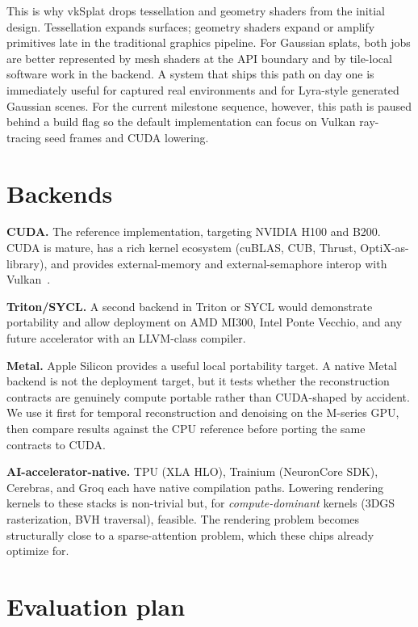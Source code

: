 \documentclass[10pt,journal]{IEEEtran}
\begin{document}
This is why vkSplat drops tessellation and geometry shaders from the
initial design. Tessellation expands surfaces; geometry shaders expand
or amplify primitives late in the traditional graphics pipeline. For
Gaussian splats, both jobs are better represented by mesh shaders at the
API boundary and by tile-local software work in the backend. A system
that ships this path on day one is immediately useful for captured real
environments and for Lyra-style generated Gaussian scenes. For the
current milestone sequence, however, this path is paused behind a build
flag so the default implementation can focus on Vulkan ray-tracing seed
frames and CUDA lowering.

\section{Backends}\label{sec:backends}

\textbf{CUDA.} The reference implementation, targeting NVIDIA H100 and
B200. CUDA is mature, has a rich kernel ecosystem (cuBLAS, CUB, Thrust,
OptiX-as-library), and provides external-memory and external-semaphore
interop with Vulkan~\cite{nvidia2020vkcuda}.

\textbf{Triton\slash SYCL.} A second backend in Triton or SYCL would
demonstrate portability and allow deployment on AMD MI300, Intel Ponte
Vecchio, and any future accelerator with an LLVM-class compiler.

\textbf{Metal.} Apple Silicon provides a useful local portability
target. A native Metal backend is not the deployment target, but it
tests whether the reconstruction contracts are genuinely compute
portable rather than CUDA-shaped by accident. We use it first for
temporal reconstruction and denoising on the M-series GPU, then compare
results against the CPU reference before porting the same contracts to
CUDA.

\textbf{AI-accelerator-native.} TPU (XLA HLO), Trainium (NeuronCore SDK),
Cerebras, and Groq each have native compilation paths. Lowering rendering
kernels to these stacks is non-trivial but, for \emph{compute-dominant}
kernels (3DGS rasterization, BVH traversal), feasible. The rendering
problem becomes structurally close to a sparse-attention problem, which
these chips already optimize for.

\section{Evaluation plan}
\end{document}
